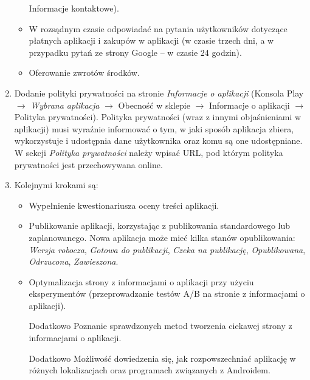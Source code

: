 \documentclass[12pt, a4paper]{article}
\begin{document}
\begin{enumerate}
\begin{itemize}
Informacje kontaktowe).
\item W rozsądnym czasie odpowiadać na pytania użytkowników dotyczące 
płatnych aplikacji i zakupów w aplikacji (w czasie trzech dni, a w przypadku 
pytań ze strony Google -- w czasie 24 godzin).
\item Oferowanie zwrotów środków.
\end{itemize}
\item Dodanie polityki prywatności na stronie \textit{Informacje o aplikacji} 
(Konsola Play $\rightarrow$ \textit{Wybrana aplikacja} $\rightarrow$ Obecność 
w sklepie $\rightarrow$ Informacje o aplikacji $\rightarrow$ Polityka 
prywatności). Polityka prywatności (wraz z innymi objaśnieniami w aplikacji) 
musi wyraźnie informować o tym, w jaki sposób aplikacja zbiera, wykorzystuje 
i udostępnia dane użytkownika oraz komu są one udostępniane. W sekcji 
\textit{Polityka prywatności} należy wpisać URL, pod którym polityka 
prywatności jest przechowywana online.
\item Kolejnymi krokami są$\colon$
\begin{itemize}
\item Wypełnienie kwestionariusza oceny treści aplikacji.
\item Publikowanie aplikacji, korzystając z publikowania standardowego lub 
zaplanowanego. Nowa aplikacja może mieć kilka stanów opublikowania$\colon$ 
\textsl{Wersja robocza}, \textsl{Gotowa do publikacji}, \textsl{Czeka na 
publikację}, \textsl{Opublikowana}, \textsl{Odrzucona}, \textsl{Zawieszona}.
\item Optymalizacja strony z informacjami o aplikacji przy użyciu 
eksperymentów (przeprowadzanie testów A/B na stronie z informacjami o 
aplikacji).
\item [Dodatkowo] Poznanie sprawdzonych metod tworzenia ciekawej strony z 
informacjami o aplikacji.
\item [Dodatkowo] Możliwość dowiedzenia się, jak rozpowszechniać aplikację w 
różnych lokalizacjach oraz programach związanych z Androidem.
\end{itemize}
\end{enumerate}
\end{document}
